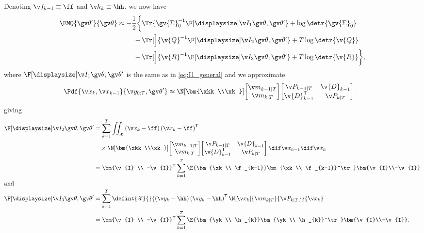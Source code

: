 Denoting $\f_{k-1}\equiv \ff$ and $\h_k\equiv \hh$, we now have
\begin{align}
\label{eq:EMQ_approx}
\begin{split}
	\EMQ{\Th'}{\Th} \approx -\frac{1}{2}\bigg\{&\Tr{\gv{\Sigma}_0^{-1}\II{1}}+\log\detr{\gv{\Sigma}_0}\\
	+\,&\Tr[\Big]{\v{Q}^{-1}\II{2}}+T\log\detr{\v{Q}}\\
	+\,&\Tr[\Big]{\v{R}^{-1}\II{3}}+T\log\detr{\v{R}}\bigg\},
\end{split}
\end{align}
where $\II{1}$ is the same as in \eqref{eq:I1_general} and
we approximate
\begin{align}
	\Pdf{\xk,\xkk}{\Y,\Th'}&\approx \N[\bm{\xkk\\\xk}]{
	\begin{bmatrix}
		\m_{k-1|T}\\
		\m_{k|T}
	\end{bmatrix}}{
	\begin{bmatrix}
		\P_{k-1|T}&\v{D}_{k-1}\\
		\v{D}_{k-1}^\tr&\P_{k|T}
	\end{bmatrix}
	}
	\label{eq:smooth_approx}
\end{align}
giving
\begin{align}
\II{2} &= \sum_{k=1}^T\iint_\mathcal{X}\left(\x_k-\ff\right)\left(\x_k-\ff\right)^\tr \nonumber\\
&\quad \times \N[\bm{\xkk\\\xk}]{
	\begin{bmatrix}
		\m_{k-1|T}\\
		\m_{k|T}
	\end{bmatrix}}{
	\begin{bmatrix}
		\P_{k-1|T}&\v{D}_{k-1}\\
		\v{D}_{k-1}^\tr&\P_{k|T}
	\end{bmatrix}
	}
	\,\dif\xkk\dif\xk \label{eq:I2_approx}\\
&=
\bm{\v{I} \\ -\v{I}}^\tr	
\sum_{k=1}^T
\E{\bm{\xk \\ \f_{k-1}}\bm{\xk \\ \f_{k-1}}^\tr} 
\bm{\v{I}\\-\v{I}}\nonumber\\	
\shortintertext{and}
\II{3} &= \sum_{k=1}^T\defint{\mathcal{X}}{}{\left(\y_k-\hh\right)\left(\y_k-\hh\right)^\tr\N[\xk]{\m_{k|T}}{\P_{k|T}}}{\xk} \label{eq:I3_approx}\\
&=
\bm{\v{I} \\ -\v{I}}^\tr	
\sum_{k=1}^T
\E{\bm{\yk \\ \h_{k}}\bm{\yk \\ \h_{k}}^\tr} 
\bm{\v{I}\\-\v{I}}. \nonumber	
\end{align}
